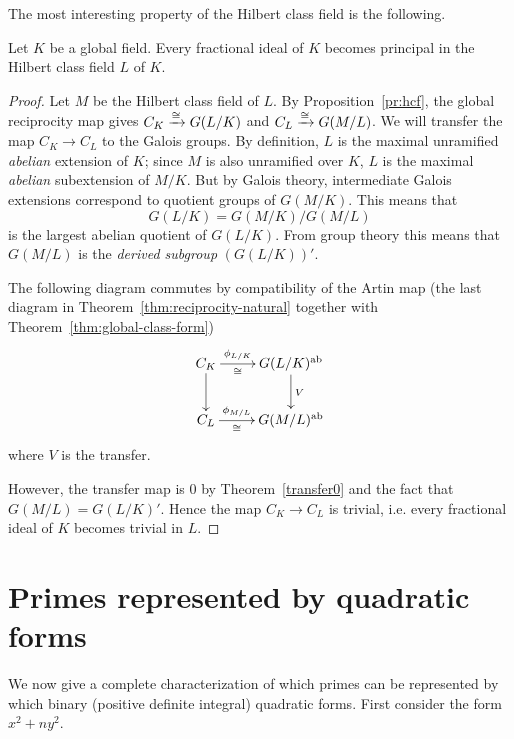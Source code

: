 The most interesting property of the Hilbert class field is the following.
\begin{thm}
Let $K$ be a global field. Every fractional ideal of $K$ becomes principal in the Hilbert class field $L$ of $K$.
\end{thm}
\begin{proof}
Let $M$ be the Hilbert class field of $L$.
By Proposition~\ref{pr:hcf}, the global reciprocity map gives $C_K\xrightarrow{\cong} G(L/K)$ and $C_L\xrightarrow{\cong} G(M/L)$. We will transfer the map $C_K\to C_L$ to the Galois groups. %
By definition, $L$ is the maximal unramified {\it abelian} extension of $K$; since $M$ is also unramified over $K$, $L$ is the %
maximal {\it abelian} subextension of $M/K$. But by Galois theory, %
intermediate Galois extensions %
correspond to quotient groups of $G(M/K)$. This means that 
\[G(L/K)=G(M/K)/G(M/L)\]
is the largest abelian quotient of $G(L/K)$. From group theory this means that $G(M/L)$ is the {\it derived subgroup} $(G(L/K))'$. 

The following diagram commutes by compatibility of the Artin map (the last diagram in Theorem~\ref{thm:reciprocity-natural} together with Theorem~\ref{thm:global-class-form})%
\[
\xymatrix{
C_K \ar[r]^-{\phi_{L/K}}_-{\cong}\ar[d]& G(L/K)\abe\ar[d]^{V}\\
C_L \ar[r]^-{\phi_{M/L}}_-{\cong} & G(M/L)\abe
}
\]
where $V$ is the transfer.

However, the transfer map is 0 by Theorem~\ref{transfer0} and the fact that $G(M/L)=G(L/K)'$. Hence the map $C_K\to C_L$ is trivial, i.e. every fractional ideal of $K$ becomes trivial in $L$.
\end{proof}
\section{Primes represented by quadratic forms}
We now give a complete characterization of which primes can be represented by which binary (positive definite integral) quadratic forms. First consider the form $x^2+ny^2$.

